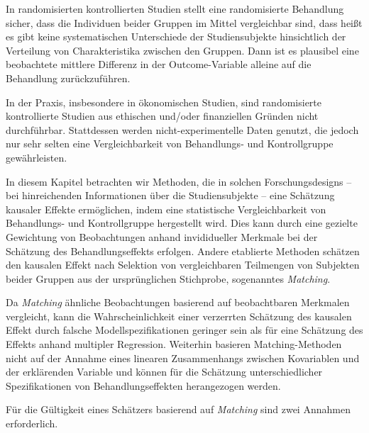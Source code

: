 \documentclass[
  a4paper,
  DIV=11,
  oneside]{scrreprt}
\begin{document}
In randomisierten kontrollierten Studien stellt eine randomisierte
Behandlung sicher, dass die Individuen beider Gruppen im Mittel
vergleichbar sind, dass heißt es gibt keine systematischen Unterschiede
der Studiensubjekte hinsichtlich der Verteilung von Charakteristika
zwischen den Gruppen. Dann ist es plausibel eine beobachtete mittlere
Differenz in der Outcome-Variable alleine auf die Behandlung
zurückzuführen.

In der Praxis, insbesondere in ökonomischen Studien, sind randomisierte
kontrollierte Studien aus ethischen und/oder finanziellen Gründen nicht
durchführbar. Stattdessen werden nicht-experimentelle Daten genutzt, die
jedoch nur sehr selten eine Vergleichbarkeit von Behandlungs- und
Kontrollgruppe gewährleisten.

In diesem Kapitel betrachten wir Methoden, die in solchen
Forschungsdesigns -- bei hinreichenden Informationen über die
Studiensubjekte -- eine Schätzung kausaler Effekte ermöglichen, indem
eine statistische Vergleichbarkeit von Behandlungs- und Kontrollgruppe
hergestellt wird. Dies kann durch eine gezielte Gewichtung von
Beobachtungen anhand invididueller Merkmale bei der Schätzung des
Behandlungseffekts erfolgen. Andere etablierte Methoden schätzen den
kausalen Effekt nach Selektion von vergleichbaren Teilmengen von
Subjekten beider Gruppen aus der ursprünglichen Stichprobe, sogenanntes
\emph{Matching}.

Da \emph{Matching} ähnliche Beobachtungen basierend auf beobachtbaren
Merkmalen vergleicht, kann die Wahrscheinlichkeit einer verzerrten
Schätzung des kausalen Effekt durch falsche Modellspezifikationen
geringer sein als für eine Schätzung des Effekts anhand multipler
Regression. Weiterhin basieren Matching-Methoden nicht auf der Annahme
eines linearen Zusammenhangs zwischen Kovariablen und der erklärenden
Variable und können für die Schätzung unterschiedlicher Spezifikationen
von Behandlungseffekten herangezogen werden.

Für die Gültigkeit eines Schätzers basierend auf \emph{Matching} sind
zwei Annahmen erforderlich.
\end{document}

